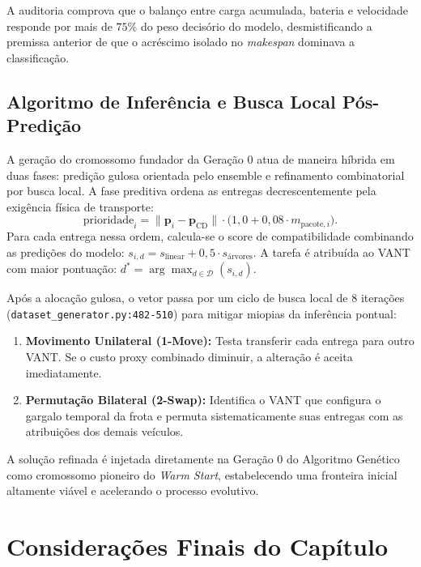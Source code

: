 A auditoria comprova que o balanço entre carga acumulada, bateria e velocidade responde por mais de $75\%$ do peso decisório do modelo, desmistificando a premissa anterior de que o acréscimo isolado no \textit{makespan} dominava a classificação.

\subsection{Algoritmo de Inferência e Busca Local Pós-Predição}

A geração do cromossomo fundador da Geração 0 atua de maneira híbrida em duas fases: predição gulosa orientada pelo ensemble e refinamento combinatorial por busca local. A fase preditiva ordena as entregas decrescentemente pela exigência física de transporte:
\begin{equation}\label{eq:prioridade_entrega}
\text{prioridade}_i = \|\mathbf{p}_i - \mathbf{p}_{\text{CD}}\| \cdot \big(1{,}0 + 0{,}08 \cdot m_{\text{pacote}, i}\big).
\end{equation}
Para cada entrega nessa ordem, calcula-se o score de compatibilidade combinando as predições do modelo: $s_{i, d} = s_{\text{linear}} + 0{,}5 \cdot s_{\text{árvores}}$. A tarefa é atribuída ao VANT com maior pontuação: $d^* = \arg\max_{d \in \mathcal{D}}(s_{i, d})$.

Após a alocação gulosa, o vetor passa por um ciclo de busca local de 8 iterações (\texttt{dataset\_generator.py:482-510}) para mitigar miopias da inferência pontual:
\begin{enumerate}
    \item \textbf{Movimento Unilateral (1-Move):} Testa transferir cada entrega para outro VANT. Se o custo proxy combinado diminuir, a alteração é aceita imediatamente.
    \item \textbf{Permutação Bilateral (2-Swap):} Identifica o VANT que configura o gargalo temporal da frota e permuta sistematicamente suas entregas com as atribuições dos demais veículos.
\end{enumerate}

A solução refinada é injetada diretamente na Geração 0 do Algoritmo Genético como cromossomo pioneiro do \textit{Warm Start}, estabelecendo uma fronteira inicial altamente viável e acelerando o processo evolutivo.

\section{Considerações Finais do Capítulo}\label{sec:dev_conclusao}

